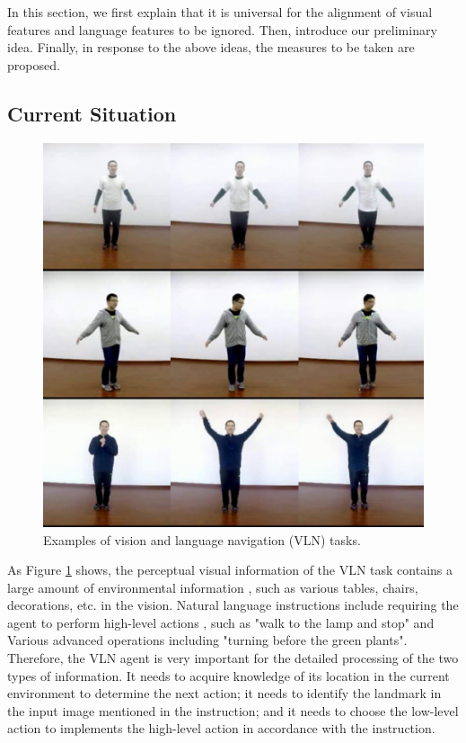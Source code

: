 In this section, we first explain that it is universal for the alignment of visual features and language features to be ignored. Then, introduce our preliminary idea. Finally, in response to the above ideas, the measures to be taken are proposed.
\vspace{-1em}
\subsection{Current Situation}	

\begin{figure}[h]

	\centering
	\includegraphics[scale=1]{image01.png}
	\caption{Examples of vision and language navigation (VLN) tasks.}
	\label{image01}
\end{figure}

As Figure \ref{image01} shows, the perceptual visual information of the VLN task contains a large amount of environmental information \cite{huang2019transferable}, such as various tables, chairs, decorations, etc. in the vision. Natural language instructions include requiring the agent to perform high-level actions \cite{majumdar2020improving}, such as "walk to the lamp and stop" and Various advanced operations including "turning before the green plants". Therefore, the VLN agent is very important for the detailed processing of the two types of information. It needs to acquire knowledge of its location in the current environment to determine the next action; it needs to identify the landmark in the input image mentioned in the instruction; and it needs to choose the low-level action to implements the high-level action in accordance with the instruction.

